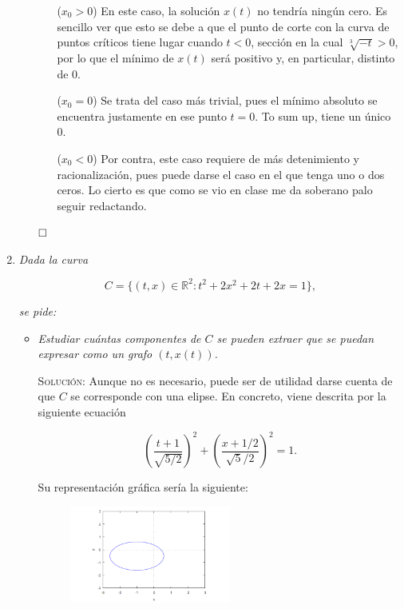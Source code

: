 \documentclass{article}
\begin{document}
\begin{enumerate}
\begin{itemize}
        \begin{itemize}
            \item[($x_0 > 0$)] En este caso, la solución $x(t)$ no tendría ningún cero. Es sencillo ver que esto se debe a que el punto de corte con la curva de puntos críticos tiene lugar cuando $t < 0$, sección en la cual $\sqrt[3]{-t} > 0$, por lo que el mínimo de $x(t)$ será positivo y, en particular, distinto de 0.

            \item[($x_0 = 0$)] Se trata del caso más trivial, pues el mínimo absoluto se encuentra justamente en ese punto $t = 0$. To sum up, tiene un único 0.

            \item[($x_0 < 0$)] Por contra, este caso requiere de más detenimiento y racionalización, pues puede darse el caso en el que tenga uno o dos ceros. Lo cierto es que como se vio en clase me da soberano palo seguir redactando.
        \end{itemize}

        $\hfill\square$
    \end{itemize}

    \vspace{12px}

    \item \textit{Dada la curva}
    
    \[C = \{(t, x) \in \mathbb{R}^2 : t^2 + 2x^2 + 2t + 2x = 1\},\]

    \textit{se pide:}

    \begin{itemize}
        \item \textit{Estudiar cuántas componentes de $C$ se pueden extraer que se puedan expresar como un grafo $(t, x(t))$.}

        \vspace{7px}

        \textsc{Solución:} Aunque no es necesario, puede ser de utilidad darse cuenta de que $C$ se corresponde con una elipse. En concreto, viene descrita por la siguiente ecuación

        \[\left(\frac{t+1}{\sqrt{5/2}}\right)^2 + \left(\frac{x+1/2}{\sqrt{5}/2}\right)^2 = 1.\]

        Su representación gráfica sería la siguiente:

        \begin{figure}[h]
            \centering
            \includegraphics[width=200px]{eclipse.png}            
        \end{figure}


\end{itemize}
\end{enumerate}
\end{document}
